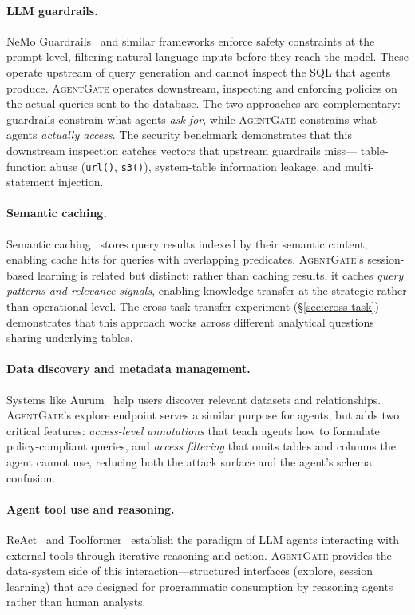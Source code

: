 \documentclass[sigconf, nonacm]{acmart}
\newcommand{\sysname}{\textsc{AgentGate}\xspace}  %
\begin{document}
\paragraph{LLM guardrails.}
NeMo Guardrails~\cite{rebedea2023nemo} and similar frameworks enforce safety
constraints at the prompt level, filtering natural-language inputs before
they reach the model.  These operate upstream of query generation and cannot
inspect the SQL that agents produce.  \sysname operates downstream,
inspecting and enforcing policies on the actual queries sent to the
database.  The two approaches are complementary: guardrails constrain what
agents \emph{ask for}, while \sysname constrains what agents
\emph{actually access}.  The security benchmark demonstrates that this
downstream inspection catches vectors that upstream guardrails miss---
table-function abuse (\texttt{url()}, \texttt{s3()}), system-table
information leakage, and multi-statement injection.

\paragraph{Semantic caching.}
Semantic caching~\cite{dar1996semantic} stores query results indexed by
their semantic content, enabling cache hits for queries with overlapping
predicates.  \sysname's session-based learning is related but distinct:
rather than caching results, it caches \emph{query patterns and relevance
signals}, enabling knowledge transfer at the strategic rather than
operational level.  The cross-task transfer experiment
(\S\ref{sec:cross-task}) demonstrates that this approach works across
different analytical questions sharing underlying tables.

\paragraph{Data discovery and metadata management.}
Systems like Aurum~\cite{fernandez2018aurum} help users discover relevant
datasets and relationships.  \sysname's explore endpoint serves a similar
purpose for agents, but adds two critical features: \emph{access-level
annotations} that teach agents how to formulate policy-compliant queries,
and \emph{access filtering} that omits tables and columns the agent
cannot use, reducing both the attack surface and the agent's schema
confusion.

\paragraph{Agent tool use and reasoning.}
ReAct~\cite{yao2023react} and Toolformer~\cite{schick2024toolformer}
establish the paradigm of LLM agents interacting with external tools
through iterative reasoning and action.  \sysname provides the data-system
side of this interaction---structured interfaces (explore, session
learning) that are designed for programmatic consumption by reasoning
agents rather than human analysts.
\end{document}
